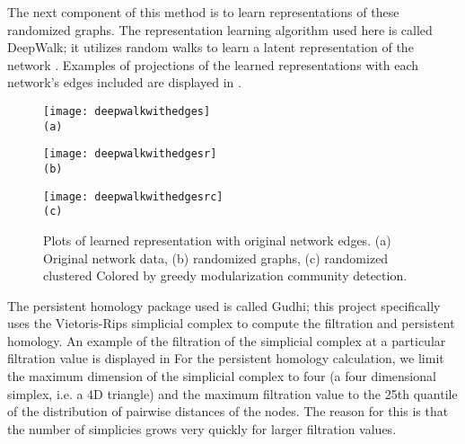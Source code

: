 \documentclass[letter,10pt,openany]{article}
\begin{document}
The next component of this method is to learn representations of these randomized graphs.
The representation learning algorithm used here is called
DeepWalk; it utilizes random walks to learn a latent representation of the network \cite{DeepWalk}.
Examples of projections of the learned representations
with each network's edges included are displayed in .

\begin{figure}[H]
\begin{minipage}[height=.5\textheight]{.48\textwidth}
\centering
\texttt{[image: deepwalkwithedges]}
\\ \small{\texttt{(a)}}
\end{minipage}
\begin{minipage}[height=.5\textheight]{.48\textwidth}
\centering
\texttt{[image: deepwalkwithedgesr]}
\\ \small{\texttt{(b)}}
\end{minipage}
\centering
\begin{minipage}[height=.5\textheight]{.48\textwidth}
\centering
\texttt{[image: deepwalkwithedgesrc]}
\\ \small{\texttt{(c)}}
\end{minipage}
\caption{\label{deepwalkwithedges}
Plots of learned representation with original network edges.
(a) Original network data, (b) randomized graphs, (c) randomized clustered
Colored by greedy modularization community detection.
}
\end{figure}

The persistent homology package used is called Gudhi; this project specifically uses
the Vietoris-Rips simplicial complex to compute the filtration and persistent homology. An example
of the filtration of the simplicial complex at a particular filtration value is displayed
in 
For the persistent homology calculation, we limit the maximum dimension of
the simplicial complex to four (a four dimensional simplex, i.e. a 4D triangle) and
the maximum filtration value to the 25th quantile of the distribution of pairwise
distances of the nodes. The reason for this is that the number of simplicies grows
very quickly for larger filtration values.
\end{document}
